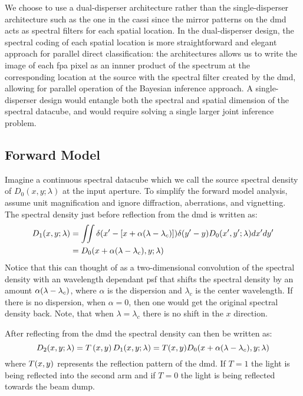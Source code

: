 We choose to use a dual-disperser architecture rather than the single-disperser architecture such as the one in the \gls{cassi} since the mirror patterns on the \gls{dmd} acts as spectral filters for each spatial location. In the dual-disperser design, the spectral coding of each spatial location is more straightforward and elegant approach for parallel direct classification: the architectures allows us to write the image of each \gls{fpa} pixel as an innner product of the spectrum at the corresponding location at the source with the spectral filter created by the \gls{dmd}, allowing for parallel operation of the Bayesian inference approach. A single-disperser design would entangle both the spectral and spatial dimension of the spectral datacube, and would require solving a single larger joint inference problem.

\subsection{Forward Model}

Imagine a continuous spectral datacube which we call the source spectral density of $D_0 \left(x, y;\lambda \right)$ at the input aperture. To simplify the forward model analysis, assume unit magnification and ignore diffraction, aberrations, and vignetting. The spectral density just before reflection from the \gls{dmd} is written as:
%
\begin{equation}
\begin{split}
		D_1 \ap{ x, y; \lambda } & = \iint \delta \ap{x^\prime - \left[ x + \alpha \ap{\lambda - \lambda_c} \right] } \delta \ap{y^\prime - y } D_0 \ap{x^\prime, y^\prime; \lambda} dx^\prime dy^\prime \\
		& = D_0 \ap{x + \alpha \ap{\lambda - \lambda_c}, y; \lambda}
\end{split}
\end{equation}
%
Notice that this can thought of as a two-dimensional convolution of the spectral density with an wavelength dependant \acrfull{psf} that shifts the spectral density by an amount $\alpha \ap{\lambda - \lambda_c}$, where $\alpha$ is the dispersion and $\lambda_c$ is the center wavelength. If there is no dispersion, when $\alpha = 0$, then one would get the original spectral density back. Note, that when $\lambda = \lambda_c$ there is no shift in the $x$ direction. 

After reflecting from the \gls{dmd} the spectral density can then be written as:
%
\begin{equation}
D_2 \ap{ x, y; \lambda } = T\left( x, y \right) D_1\ap{ x, y; \lambda} = T \ap{ x, y } D_0 \ap{x + \alpha \ap{\lambda - \lambda_c}, y; \lambda}
\end{equation}
%
where $T \ap{ x, y }$ represents the reflection pattern of the \gls{dmd}. If $T = 1$ the light is being reflected into the second arm and if $T = 0$ the light is being reflected towards the beam dump. 


